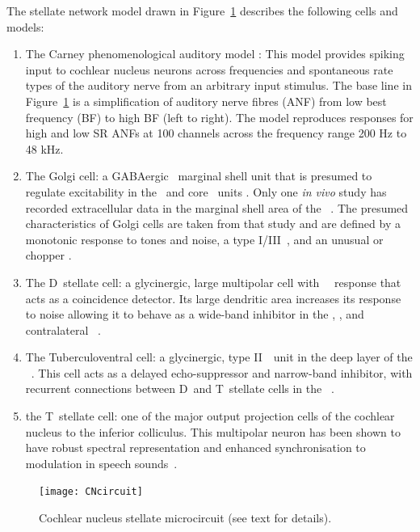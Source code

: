 The stellate network model drawn in Figure~\ref{fig:microcircuit} describes the
following cells and models:
\begin{enumerate}
\item The Carney phenomenological auditory model \citet{ZilanyBruceEtAl:2009}:
  This model provides spiking input to cochlear nucleus neurons across
  frequencies and spontaneous rate types of the auditory nerve from an arbitrary
  input stimulus. The base line in Figure~\ref{fig:microcircuit} is a
  simplification of auditory nerve fibres (ANF) from low best frequency (BF) to
  high BF (left to right). The model reproduces responses for high and low SR
  ANFs at 100 channels across the frequency range 200 Hz to 48 kHz.
\item The Golgi cell: a {GABA}ergic \VCN~marginal shell unit that is presumed to
  regulate excitability in the \GCD~and core \VCN~units
  \citep{FerragamoGoldingEtAl:1998}. Only one \textit{in vivo} study has
  recorded extracellular data in the marginal shell area of the
  \CN~\citep{GhoshalKim:1997}. The presumed characteristics of Golgi cells are
  taken from that study and are defined by a monotonic response to tones and
  noise, a type I\slash III~\EIRA, and an unusual or chopper {\PSTH}.
\item The D~stellate cell: a glycinergic, large multipolar cell with
  \OnC~\PSTH~response that acts as a coincidence detector. Its large dendritic
  area increases its response to noise allowing it to behave as a wide-band
  inhibitor in the \VCN, \DCN, and contralateral
  \CN~\citep{SmithMassieEtAl:2005,ArnottWallaceEtAl:2004,NeedhamPaolini:2007}.
\item The Tuberculoventral cell: a glycinergic, type II~{\EIRA}~unit in the deep
  layer of the \DCN~\citep{SpirouDavisEtAl:1999}.  This cell acts as a delayed
  echo-suppressor and narrow-band inhibitor, with recurrent connections between
  D~and T~stellate cells in the \VCN~\citep{Alibardi:2006,OertelWickesberg:1993,WickesbergWhitlonEtAl:1991}.
\item the T~stellate cell: one of the major output projection cells of the
  cochlear nucleus to the inferior colliculus. This multipolar neuron has been
  shown to have robust spectral representation and enhanced synchronisation to
  modulation in speech sounds~\citep{BlackburnSachs:1990,KeilsonRichardsEtAl:1997}.
\end{enumerate}

\begin{figure}[htb]
  \centering
  \texttt{[image: CNcircuit]}
  \caption[Cochlear nucleus stellate microcircuit]{Cochlear nucleus stellate microcircuit (see text for details). }
  \label{fig:microcircuit}
\end{figure}

